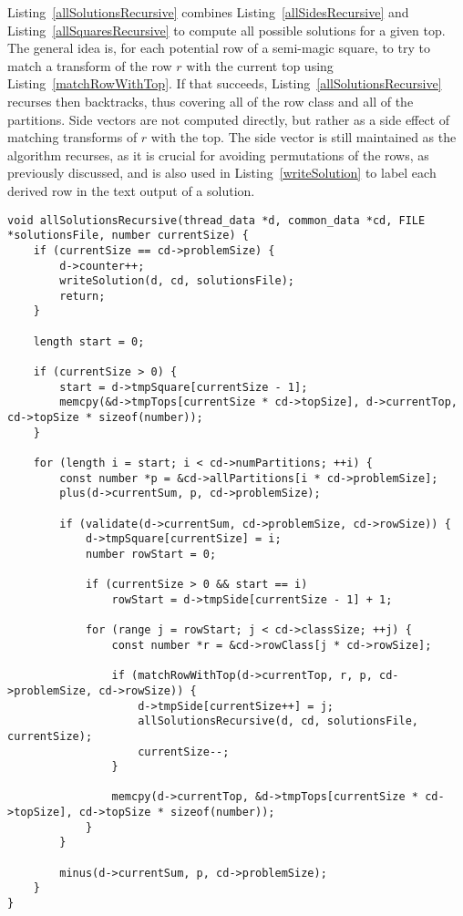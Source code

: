 Listing~\ref{allSolutionsRecursive} combines Listing~\ref{allSidesRecursive} and Listing~\ref{allSquaresRecursive} to compute all possible solutions for a given top. The general idea is, for each potential row of a semi-magic square, to try to match a transform of the row $r$ with the current top using Listing~\ref{matchRowWithTop}. If that succeeds, Listing~\ref{allSolutionsRecursive} recurses then backtracks, thus covering all of the row class and all of the partitions. Side vectors are not computed directly, but rather as a side effect of matching transforms of $r$ with the top. The side vector is still maintained as the algorithm recurses, as it is crucial for avoiding permutations of the rows, as previously discussed, and is also used in Listing~\ref{writeSolution} to label each derived row in the text output of a solution.

\begin{lstlisting}[caption={Recursively computing all solutions for a top vector of a certain size.},label={allSolutionsRecursive}]
void allSolutionsRecursive(thread_data *d, common_data *cd, FILE *solutionsFile, number currentSize) {
    if (currentSize == cd->problemSize) {
        d->counter++;
        writeSolution(d, cd, solutionsFile);
        return;
    }

    length start = 0;

    if (currentSize > 0) {
        start = d->tmpSquare[currentSize - 1];
        memcpy(&d->tmpTops[currentSize * cd->topSize], d->currentTop, cd->topSize * sizeof(number));
    }

    for (length i = start; i < cd->numPartitions; ++i) {
        const number *p = &cd->allPartitions[i * cd->problemSize];
        plus(d->currentSum, p, cd->problemSize);

        if (validate(d->currentSum, cd->problemSize, cd->rowSize)) {
            d->tmpSquare[currentSize] = i;
            number rowStart = 0;

            if (currentSize > 0 && start == i)
                rowStart = d->tmpSide[currentSize - 1] + 1;

            for (range j = rowStart; j < cd->classSize; ++j) {
                const number *r = &cd->rowClass[j * cd->rowSize];

                if (matchRowWithTop(d->currentTop, r, p, cd->problemSize, cd->rowSize)) {
                    d->tmpSide[currentSize++] = j;
                    allSolutionsRecursive(d, cd, solutionsFile, currentSize);
                    currentSize--;
                }

                memcpy(d->currentTop, &d->tmpTops[currentSize * cd->topSize], cd->topSize * sizeof(number));
            }
        }

        minus(d->currentSum, p, cd->problemSize);
    }
}
\end{lstlisting}

